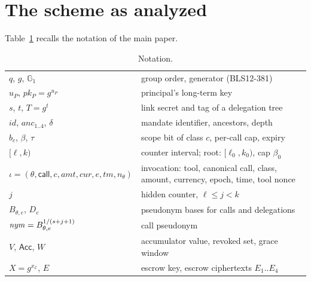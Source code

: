 \section{The scheme as analyzed}\label{s:scheme}
Table~\ref{tab:notation} recalls the notation of the main paper.
\begin{table}[t]\centering\caption{Notation.}\label{tab:notation}
\setlength{\tabcolsep}{3pt}
\begin{tabular}{@{}l>{\raggedright\arraybackslash}p{}@{}}\toprule
$q$, $g$, $\mathbb{G}_1$ & group order, generator (BLS12-381)\\
$u_P$, $pk_P=g^{u_P}$ & principal's long-term key\\
$s$, $t$, $T=g^t$ & link secret and tag of a delegation tree\\
$\mathit{id}$, $\mathit{anc}_{1..4}$, $\delta$ & mandate identifier, ancestors, depth\\
$b_c$, $\beta$, $\tau$ & scope bit of class $c$, per-call cap, expiry\\
$[\ell,k)$ & counter interval; root: $[\ell_0,k_0)$, cap $\beta_0$\\
$\iota=(\theta,\mathsf{call},c,\mathit{amt},\mathit{cur},e,\mathit{tm},n_\theta)$ & invocation: tool, canonical call, class, amount, currency, epoch, time, tool nonce\\
$j$ & hidden counter, $\ell\le j<k$\\
$B_{\theta,e}$, $D_e$ & pseudonym bases for calls and delegations\\
$\mathit{nym}=B_{\theta,e}^{1/(s+j+1)}$ & call pseudonym\\
$V$, $\mathsf{Acc}$, $W$ & accumulator value, revoked set, grace window\\
$X=g^{x_{\mathcal{E}}}$, $E$ & escrow key, escrow ciphertexts $E_1..E_4$\\\bottomrule
\end{tabular}
\end{table}

